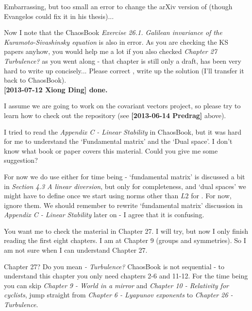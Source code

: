 \begin{description}
Embarrassing, but too small an error to change the arXiv version of 
(though Evangelos could fix it in his thesis)...

Now I note that the ChaosBook {\em Exercise
26.1.
Galilean invariance of the Kuramoto-Sivashinsky equation} is also in error.
As you are checking the KS papers anyhow, you would help me a lot if you also
checked {\em Chapter 27 Turbulence?} as you went along - that chapter is still
only a draft, has been very hard to write up concisely...
Please correct , write up the solution
(I'll transfer it back to ChaosBook).                   \toCB
\\{\bf [2013-07-12 Xiong Ding] done.}

\item[2013-07-04 Predrag] I assume we are going to work on the
    covariant vectors project, so please try to learn how to check out
    the repository (see {\bf [2013-06-14 Predrag]} above).

\item[2013-07-05 Xiong Ding] I tried to read the \emph{Appendix C - Linear
    Stability} in ChaosBook, but it was hard for me to understand the
    `Fundamental matrix' and the `Dual space'. I don't know what book
    or paper covers this material. Could you give me some suggestion?

For now we do use either for time being - `fundamental matrix' is
discussed a bit in
\emph{ {Section 4.3} A
linear diversion}, but only for completeness, and `dual spaces' we might
have to define once we start using norms other than $L2$ for \KS. For
now, ignore them. We should remember to rewrite `fundamental matrix'
discussion in
\emph{ {Appendix
C} - Linear Stability} later on - I agree that it is confusing.

\item[2013-07-05 Xiong Ding]
You want me to check the material in Chapter 27. I
will try, but now I only finish reading the first eight chapters. I am
at Chapter 9 (groups and symmetries). So I am not sure when I can
understand Chapter 27.

\item[2013-07-05 Predrag] Chapter 27? Do you mean \emph{
 - Turbulence?}
ChaosBook is not sequential - to understand this chapter you only need
chapters 2-6 and 11-12. For the time being you can skip
{\em Chapter 9 - World in a mirror} and
{\em Chapter 10 - Relativity for cyclists}, jump straight from
{\em Chapter 6 - Lyapunov exponents} to {\em {Chapter 26} - Turbulence}.


\end{description}
